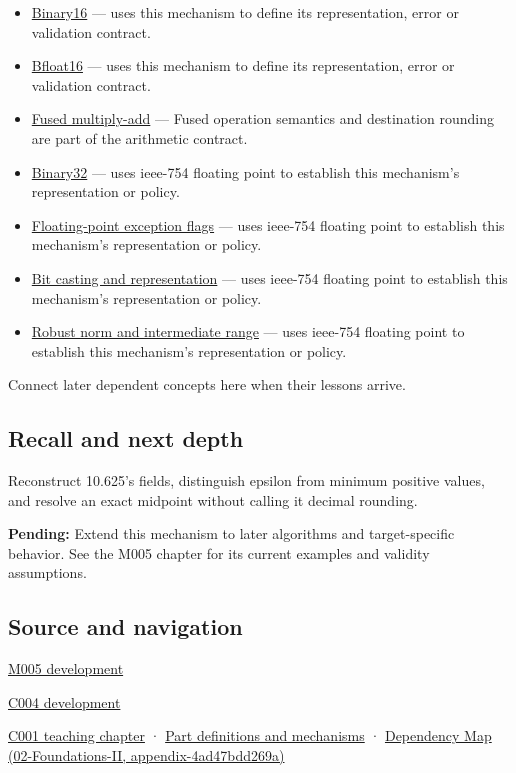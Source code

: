 \begin{itemize}
\item
  \hyperref[appendix-34443cec7170]{Binary16} --- uses this mechanism to define its representation, error or validation contract.
\item
  \hyperref[appendix-18b8dd966b5d]{Bfloat16} --- uses this mechanism to define its representation, error or validation contract.
\item
  \hyperref[appendix-41e8ef22a21e]{Fused multiply-add} --- Fused operation semantics and destination rounding are part of the arithmetic contract.
\item
  \hyperref[appendix-5057f9ad327f]{Binary32} --- uses ieee-754 floating point to establish this mechanism's representation or policy.
\item
  \hyperref[appendix-ed8531b46754]{Floating-point exception flags} --- uses ieee-754 floating point to establish this mechanism's representation or policy.
\item
  \hyperref[appendix-34ee45f161c1]{Bit casting and representation} --- uses ieee-754 floating point to establish this mechanism's representation or policy.
\item
  \hyperref[appendix-7f1e17dcafb1]{Robust norm and intermediate range} --- uses ieee-754 floating point to establish this mechanism's representation or policy.
\end{itemize}

Connect later dependent concepts here when their lessons arrive.

\subsection{Recall and next depth}\label{appendix-343615f49ddf-recall-and-next-depth}

Reconstruct 10.625's fields, distinguish epsilon from minimum positive values, and resolve an exact midpoint without calling it decimal rounding.

\textbf{Pending:} Extend this mechanism to later algorithms and target-specific behavior. See the M005 chapter for its current examples and validity assumptions.

\subsection{Source and navigation}\label{appendix-343615f49ddf-source-and-navigation}

\hyperref[01-foundations-i-ch001-when-arithmetic-meets-uncertainty]{M005 development}

\hyperref[01-foundations-i-ch001-a-stretching-ruler-for-real-valued-quantities]{C004 development}

\hyperref[01-foundations-i-ch001-from-a-signal-to-an-interpretation]{C001 teaching chapter} · \hyperref[appendix-fd090d982a15]{Part definitions and mechanisms} · \href{../02-Foundations-II/main.pdf\#nameddest=appendix-4ad47bdd269a}{Dependency Map (02-Foundations-II, appendix-4ad47bdd269a)}
